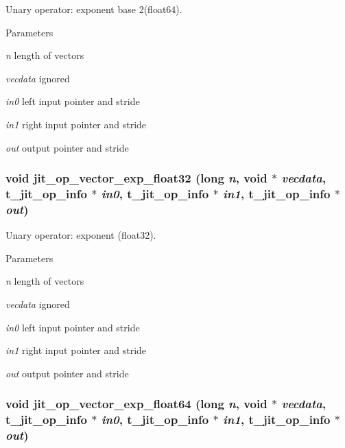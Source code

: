 Unary operator: exponent base 2(float64). 
\begin{DoxyParams}{Parameters}
\item[{\em n}]length of vectors \item[{\em vecdata}]ignored \item[{\em in0}]left input pointer and stride \item[{\em in1}]right input pointer and stride \item[{\em out}]output pointer and stride \end{DoxyParams}
\hypertarget{group__opvecmod_gad7efeea7c1d620197481cb1b9d7b46e4}{
\subsubsection[{jit\_\-op\_\-vector\_\-exp\_\-float32}]{\setlength{\rightskip}{0pt plus 5cm}void jit\_\-op\_\-vector\_\-exp\_\-float32 (long {\em n}, \/  void $\ast$ {\em vecdata}, \/  {\bf t\_\-jit\_\-op\_\-info} $\ast$ {\em in0}, \/  {\bf t\_\-jit\_\-op\_\-info} $\ast$ {\em in1}, \/  {\bf t\_\-jit\_\-op\_\-info} $\ast$ {\em out})}}
\label{group__opvecmod_gad7efeea7c1d620197481cb1b9d7b46e4}


Unary operator: exponent (float32). 
\begin{DoxyParams}{Parameters}
\item[{\em n}]length of vectors \item[{\em vecdata}]ignored \item[{\em in0}]left input pointer and stride \item[{\em in1}]right input pointer and stride \item[{\em out}]output pointer and stride \end{DoxyParams}
\hypertarget{group__opvecmod_gabc5acddc043079dbc7cb1cce21aba954}{
\subsubsection[{jit\_\-op\_\-vector\_\-exp\_\-float64}]{\setlength{\rightskip}{0pt plus 5cm}void jit\_\-op\_\-vector\_\-exp\_\-float64 (long {\em n}, \/  void $\ast$ {\em vecdata}, \/  {\bf t\_\-jit\_\-op\_\-info} $\ast$ {\em in0}, \/  {\bf t\_\-jit\_\-op\_\-info} $\ast$ {\em in1}, \/  {\bf t\_\-jit\_\-op\_\-info} $\ast$ {\em out})}}
\label{group__opvecmod_gabc5acddc043079dbc7cb1cce21aba954}


